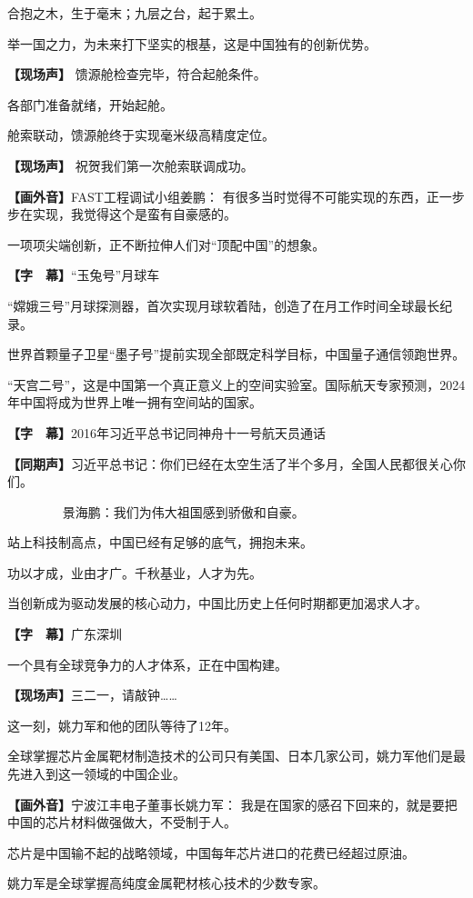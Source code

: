 \documentclass{ctexart}
\newcommand{\zkh}[1]{\textbf{\hspace{-2.7em} 【#1】}}
\begin{document}
 合抱之木，生于毫末；九层之台，起于累土。

 举一国之力，为未来打下坚实的根基，这是中国独有的创新优势。

 \zkh{现场声} 馈源舱检查完毕，符合起舱条件。

 各部门准备就绪，开始起舱。

 舱索联动，馈源舱终于实现毫米级高精度定位。

 \zkh{现场声} 祝贺我们第一次舱索联调成功。

 \zkh{画外音}FAST工程调试小组姜鹏： 有很多当时觉得不可能实现的东西，正一步步在实现，我觉得这个是蛮有自豪感的。

 一项项尖端创新，正不断拉伸人们对``顶配中国''的想象。

 \zkh{字　幕}``玉兔号''月球车

``嫦娥三号''月球探测器，首次实现月球软着陆，创造了在月工作时间全球最长纪录。

 世界首颗量子卫星``墨子号''提前实现全部既定科学目标，中国量子通信领跑世界。

``天宫二号''，这是中国第一个真正意义上的空间实验室。国际航天专家预测，2024年中国将成为世界上唯一拥有空间站的国家。

 \zkh{字　幕}2016年习近平总书记同神舟十一号航天员通话

 \zkh{同期声}习近平总书记：你们已经在太空生活了半个多月，全国人民都很关心你们。

 　　　　 景海鹏：我们为伟大祖国感到骄傲和自豪。

 站上科技制高点，中国已经有足够的底气，拥抱未来。

 功以才成，业由才广。千秋基业，人才为先。

 当创新成为驱动发展的核心动力，中国比历史上任何时期都更加渴求人才。

 \zkh{字　幕}广东深圳

 一个具有全球竞争力的人才体系，正在中国构建。

 \zkh{现场声}三二一，请敲钟{\ldots}{\ldots}

 这一刻，姚力军和他的团队等待了12年。

全球掌握芯片金属靶材制造技术的公司只有美国、日本几家公司，姚力军他们是最先进入到这一领域的中国企业。

 \zkh{画外音}宁波江丰电子董事长姚力军： 我是在国家的感召下回来的，就是要把中国的芯片材料做强做大，不受制于人。

 芯片是中国输不起的战略领域，中国每年芯片进口的花费已经超过原油。

 姚力军是全球掌握高纯度金属靶材核心技术的少数专家。
\end{document}
